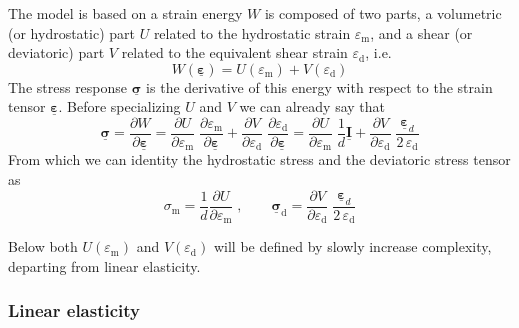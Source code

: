 \documentclass[times,namecite]{goose-article}
\newcommand\T[1]{\underline{\bm{{#1}}}}
\begin{document}
The model is based on a strain energy $W$ is composed of two parts, a volumetric (or hydrostatic) part $U$ related to the hydrostatic strain $\varepsilon_\mathrm{m}$, and a shear (or deviatoric) part $V$ related to the equivalent shear strain $\varepsilon_\mathrm{d}$, i.e.\
\begin{equation}
  W ( \T{\varepsilon} ) = U ( \varepsilon_\mathrm{m} ) + V ( \varepsilon_\mathrm{d} )
\end{equation}
The stress response $\T{\sigma}$ is the derivative of this energy with respect to the strain tensor $\T{\varepsilon}$. Before specializing $U$ and $V$ we can already say that
\begin{equation}\label{eq:dU-dV:elas}
  \T{\sigma}
  =
  \frac{\partial W}{\partial \T{\varepsilon}}
  =
  \frac{\partial U}{\partial \varepsilon_\mathrm{m}} \;
  \frac{\partial \varepsilon_\mathrm{m}}{\partial \T{\varepsilon}}
  +
  \frac{\partial V}{\partial \varepsilon_\mathrm{d}} \;
  \frac{\partial \varepsilon_\mathrm{d}}{\partial \T{\varepsilon}}
  =
  \frac{\partial U}{\partial \varepsilon_\mathrm{m}} \;
  \frac{1}{d} \T{I}
  +
  \frac{\partial V}{\partial \varepsilon_\mathrm{d}} \;
  \frac{\T{\varepsilon}_d}{2 \, \varepsilon_\mathrm{d}}
\end{equation}
From which we can identity the hydrostatic stress and the deviatoric stress tensor as
\begin{equation}\label{stress:generic}
  \sigma_\mathrm{m} = \frac{1}{d} \frac{\partial U}{\partial \varepsilon_\mathrm{m}}
  \;, \qquad
  \T{\sigma}_\mathrm{d}
  =
  \frac{\partial V}{\partial \varepsilon_\mathrm{d}} \;
  \frac{\T{\varepsilon}_d}{2 \, \varepsilon_\mathrm{d}}
\end{equation}

Below both $U(\varepsilon_\mathrm{m})$ and $V(\varepsilon_\mathrm{d})$ will be defined by slowly increase complexity, departing from linear elasticity.

\subsubsection{Linear elasticity}
\end{document}
